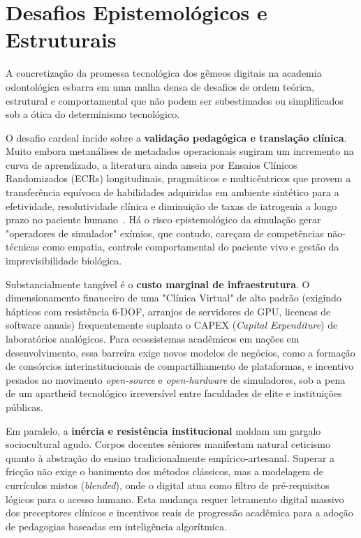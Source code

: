\section{Desafios Epistemológicos e Estruturais}
\label{sec:desafios-educ}

A concretização da promessa tecnológica dos gêmeos digitais na academia odontológica esbarra em uma malha densa de desafios de ordem teórica, estrutural e comportamental que não podem ser subestimados ou simplificados sob a ótica do determinismo tecnológico.

O desafio cardeal incide sobre a \textbf{validação pedagógica e translação clínica}. Muito embora metanálises de metadados operacionais sugiram um incremento na curva de aprendizado, a literatura ainda anseia por Ensaios Clínicos Randomizados (ECRs) longitudinais, pragmáticos e multicêntricos que provem a transferência equívoca de habilidades adquiridas em ambiente sintético para a efetividade, resolutividade clínica e diminuição de taxas de iatrogenia a longo prazo no paciente humano~\cite{aisoc2026realising}. Há o risco epistemológico da simulação gerar "operadores de simulador" exímios, que contudo, careçam de competências não-técnicas como empatia, controle comportamental do paciente vivo e gestão da imprevisibilidade biológica.


Substancialmente tangível é o \textbf{custo marginal de infraestrutura}. O dimensionamento financeiro de uma "Clínica Virtual" de alto padrão (exigindo hápticos com resistência 6-DOF, arranjos de servidores de GPU, licencas de software anuais) frequentemente suplanta o CAPEX (\textit{Capital Expenditure}) de laboratórios analógicos. Para ecossistemas acadêmicos em nações em desenvolvimento, essa barreira exige novos modelos de negócios, como a formação de consórcios interinstitucionais de compartilhamento de plataformas, e incentivo pesados no movimento \textit{open-source} e \textit{open-hardware} de simuladores, sob a pena de um apartheid tecnológico irreversível entre faculdades de elite e instituições públicas.

Em paralelo, a \textbf{inércia e resistência institucional} moldam um gargalo sociocultural agudo. Corpos docentes sêniores manifestam natural ceticismo quanto à abstração do ensino tradicionalmente empírico-artesanal. Superar a fricção não exige o banimento dos métodos clássicos, mas a modelagem de currículos mistos (\textit{blended}), onde o digital atua como filtro de pré-requisitos lógicos para o acesso humano. Esta mudança requer letramento digital massivo dos preceptores clínicos e incentivos reais de progressão acadêmica para a adoção de pedagogias baseadas em inteligência algorítmica.


